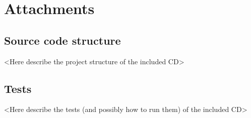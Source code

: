 \documentclass[licencjacka,en]{pracamgr}
\begin{document}

\chapter*{Attachments}

\section*{Source code structure}

<Here describe the project structure of the included CD>


\section*{Tests}

<Here describe the tests (and possibly how to run them) of the included CD>
\end{document}
